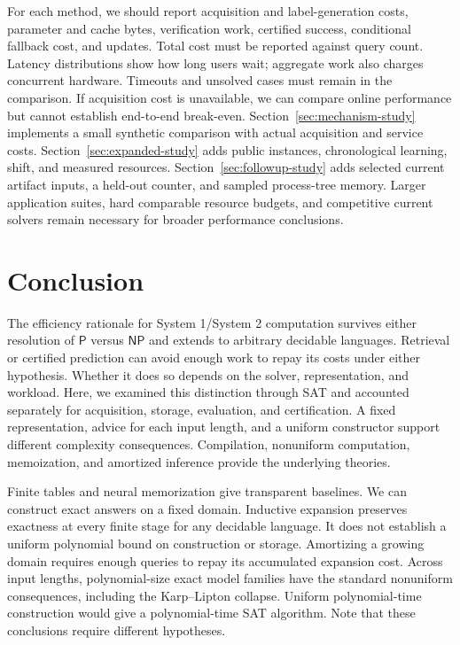 \documentclass[11pt,a4paper]{article}
\numberwithin{equation}{section}
\newcommand{\Pclass}{\mathsf{P}}
\newcommand{\NPclass}{\mathsf{NP}}
\theoremstyle{plain}
\theoremstyle{definition}
\theoremstyle{remark}
\begin{document}
For each method, we should report acquisition and label-generation costs, parameter and cache bytes, verification work, certified success, conditional fallback cost, and updates. Total cost must be reported against query count. Latency distributions show how long users wait; aggregate work also charges concurrent hardware. Timeouts and unsolved cases must remain in the comparison. If acquisition cost is unavailable, we can compare online performance but cannot establish end-to-end break-even. Section~\ref{sec:mechanism-study} implements a small synthetic comparison with actual acquisition and service costs. Section~\ref{sec:expanded-study} adds public instances, chronological learning, shift, and measured resources. Section~\ref{sec:followup-study} adds selected current artifact inputs, a held-out counter, and sampled process-tree memory. Larger application suites, hard comparable resource budgets, and competitive current solvers remain necessary for broader performance conclusions.

\section{Conclusion}

The efficiency rationale for System 1/System 2 computation survives either resolution of $\Pclass$ versus $\NPclass$ and extends to arbitrary decidable languages. Retrieval or certified prediction can avoid enough work to repay its costs under either hypothesis. Whether it does so depends on the solver, representation, and workload. Here, we examined this distinction through SAT and accounted separately for acquisition, storage, evaluation, and certification. A fixed representation, advice for each input length, and a uniform constructor support different complexity consequences. Compilation, nonuniform computation, memoization, and amortized inference provide the underlying theories.

Finite tables and neural memorization give transparent baselines. We can construct exact answers on a fixed domain. Inductive expansion preserves exactness at every finite stage for any decidable language. It does not establish a uniform polynomial bound on construction or storage. Amortizing a growing domain requires enough queries to repay its accumulated expansion cost. Across input lengths, polynomial-size exact model families have the standard nonuniform consequences, including the Karp--Lipton collapse. Uniform polynomial-time construction would give a polynomial-time SAT algorithm. Note that these conclusions require different hypotheses.
\end{document}
